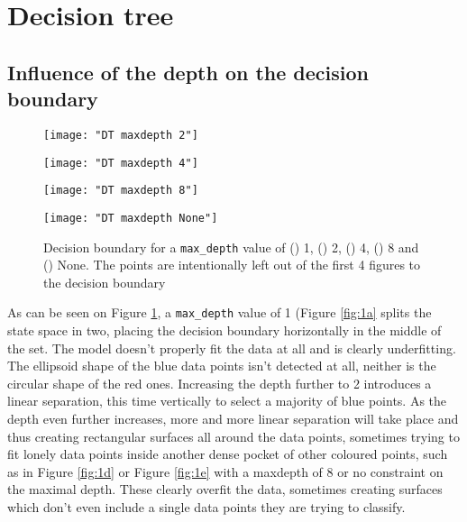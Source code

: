 \documentclass[12pt]{article}
\begin{document}
\section{Decision tree}

\subsection{Influence of the depth on the decision boundary}

\begin{figure}[htbp]
\centering
\begin{minipage}{0.3\linewidth}%
  \centering
\label{fig:1a}%
\end{minipage}%
\begin{minipage}{0.3\linewidth}%
  \centering
  \texttt{[image: "DT maxdepth 2"]}%
\label{fig:1b}%
\end{minipage}%
\begin{minipage}{0.3\linewidth}%
  \centering
  \texttt{[image: "DT maxdepth 4"]}%
\label{fig:1c}%
\end{minipage}
\newline
\centering
\begin{minipage}{0.3\linewidth}%
  \centering
  \texttt{[image: "DT maxdepth 8"]}%
\label{fig:1d}%
\end{minipage}%
\begin{minipage}{0.3\linewidth}%
  \centering
  \texttt{[image: "DT maxdepth None"]}%
\label{fig:1e}%
\end{minipage}%

\caption{ \label{fig:maxdepth} Decision boundary for a \texttt{max\_depth} value of () 1, () 2, () 4, () 8 and () None. The points are intentionally left out of the first 4 figures to the decision boundary}
\end{figure}

As can be seen on Figure \ref{fig:maxdepth}, a \texttt{max\_depth} value of 1 (Figure \ref{fig:1a} splits the state space in two, placing the decision boundary horizontally in the middle of the set. The model doesn't properly fit the data at all and is clearly underfitting. The ellipsoid shape of the blue data points isn't detected at all, neither is the circular shape of the red ones.
Increasing the depth further to 2 introduces a linear separation, this time vertically to select a majority of blue points. 
As the depth even further increases, more and more linear separation will take place and thus creating rectangular surfaces all around the data points, sometimes trying to fit lonely data points inside another dense pocket of other coloured points, such as in Figure \ref{fig:1d} or Figure \ref{fig:1e} with a maxdepth of 8 or no constraint on the maximal depth. These clearly overfit the data, sometimes creating surfaces which don't even include a single data points they are trying to classify.
\end{document}
